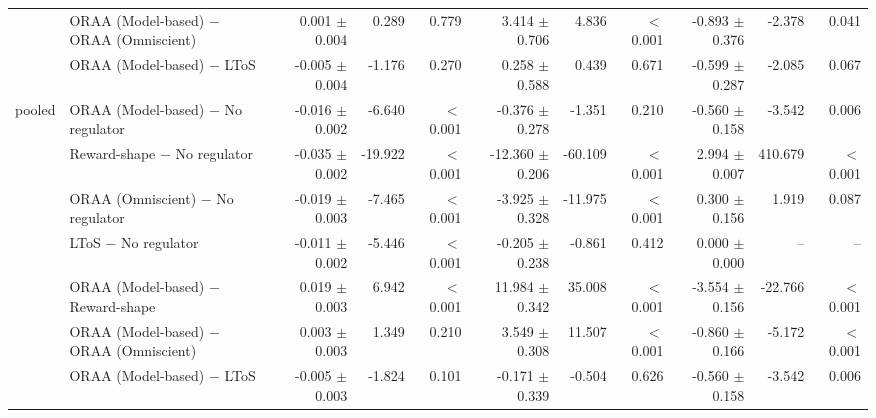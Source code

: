\begin{tabular}{llrrrrrrrrr}
 & ORAA (Model-based) $-$ ORAA (Omniscient) & 0.001 $\pm$ 0.004 & 0.289 & 0.779 & 3.414 $\pm$ 0.706 & 4.836 & $<$0.001 & -0.893 $\pm$ 0.376 & -2.378 & 0.041 \\
 & ORAA (Model-based) $-$ LToS & -0.005 $\pm$ 0.004 & -1.176 & 0.270 & 0.258 $\pm$ 0.588 & 0.439 & 0.671 & -0.599 $\pm$ 0.287 & -2.085 & 0.067 \\
\addlinespace
pooled & ORAA (Model-based) $-$ No regulator & -0.016 $\pm$ 0.002 & -6.640 & $<$0.001 & -0.376 $\pm$ 0.278 & -1.351 & 0.210 & -0.560 $\pm$ 0.158 & -3.542 & 0.006 \\
 & Reward-shape $-$ No regulator & -0.035 $\pm$ 0.002 & -19.922 & $<$0.001 & -12.360 $\pm$ 0.206 & -60.109 & $<$0.001 & 2.994 $\pm$ 0.007 & 410.679 & $<$0.001 \\
 & ORAA (Omniscient) $-$ No regulator & -0.019 $\pm$ 0.003 & -7.465 & $<$0.001 & -3.925 $\pm$ 0.328 & -11.975 & $<$0.001 & 0.300 $\pm$ 0.156 & 1.919 & 0.087 \\
 & LToS $-$ No regulator & -0.011 $\pm$ 0.002 & -5.446 & $<$0.001 & -0.205 $\pm$ 0.238 & -0.861 & 0.412 & 0.000 $\pm$ 0.000 & -- & -- \\
 & ORAA (Model-based) $-$ Reward-shape & 0.019 $\pm$ 0.003 & 6.942 & $<$0.001 & 11.984 $\pm$ 0.342 & 35.008 & $<$0.001 & -3.554 $\pm$ 0.156 & -22.766 & $<$0.001 \\
 & ORAA (Model-based) $-$ ORAA (Omniscient) & 0.003 $\pm$ 0.003 & 1.349 & 0.210 & 3.549 $\pm$ 0.308 & 11.507 & $<$0.001 & -0.860 $\pm$ 0.166 & -5.172 & $<$0.001 \\
 & ORAA (Model-based) $-$ LToS & -0.005 $\pm$ 0.003 & -1.824 & 0.101 & -0.171 $\pm$ 0.339 & -0.504 & 0.626 & -0.560 $\pm$ 0.158 & -3.542 & 0.006 \\
\bottomrule
\end{tabular}
